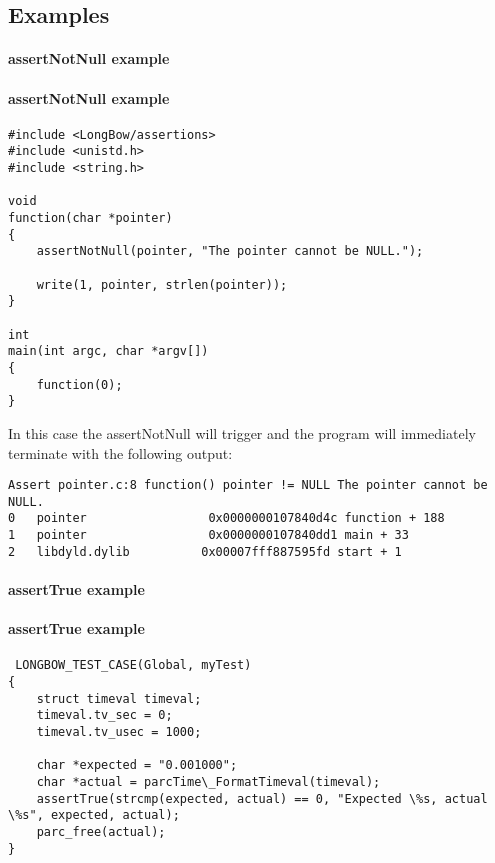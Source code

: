 \documentclass[12pt]{article} %
\begin{document}
\subsection{Examples }  

\paragraph {assertNotNull example}
\paragraph {assertNotNull example}

\begin{lstlisting}
#include <LongBow/assertions>
#include <unistd.h>
#include <string.h>

void
function(char *pointer)
{
    assertNotNull(pointer, "The pointer cannot be NULL.");

    write(1, pointer, strlen(pointer));
}

int
main(int argc, char *argv[])
{
    function(0);
}
\end{lstlisting}


In this case the assertNotNull will trigger and the program will immediately terminate with the following output:

\begin{lstlisting}
Assert pointer.c:8 function() pointer != NULL The pointer cannot be NULL.
0   pointer                 0x0000000107840d4c function + 188
1   pointer                 0x0000000107840dd1 main + 33
2   libdyld.dylib          0x00007fff887595fd start + 1

\end{lstlisting}

\paragraph {assertTrue example}
  \paragraph {assertTrue example}

 \begin{lstlisting}
 LONGBOW_TEST_CASE(Global, myTest)
{
    struct timeval timeval;
    timeval.tv_sec = 0;
    timeval.tv_usec = 1000;
    
    char *expected = "0.001000";
    char *actual = parcTime\_FormatTimeval(timeval);
    assertTrue(strcmp(expected, actual) == 0, "Expected \%s, actual \%s", expected, actual);
    parc_free(actual);
}
 \end{lstlisting}
 
\end{document}
